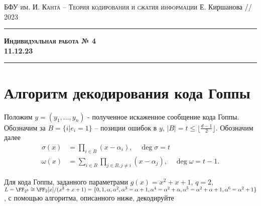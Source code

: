 \documentclass[11pt]{exam}
\theoremstyle{definition}
\newcommand*\abs[1]{\left\lvert#1\right\rvert}
\begin{document}
	{\noindent
		\textsc{БФУ им. И. Канта -- Теория кодирования и сжатия информации}
		\hfill {Е. Киршанова // 2023\\}
	\hrule
	\begin{center}
		{\Large\textbf{
				\textsc{Индивидуальная работа № 4} \\[5pt] {11.12.23}
		} } 
	\end{center}
	\hrule \vspace{5mm}
	
	\thispagestyle{empty}
	
	\vspace{0.2cm}
	
		
	
\section{Алгоритм декодирования кода Гоппы}
		Положим $y = (y_1, \ldots, y_n)$ - полученное искаженное сообщение кода Гоппы. Обозначим за $B = \{ i \vert e_i = 1\}$ -- позиции ошибок в $y$, $\abs{B} = t \leq \lfloor \frac{d-1}{2} \rfloor$. Обозначим далее
		\begin{align*}
				\sigma(x) &= \prod_{i \in B} (x - \alpha_i), \quad \deg \sigma = t \\
				\omega(x) & = \sum_{i \in B} \prod_{j \in B, j \neq i} (x - \alpha_j), \quad \deg \omega = t-1.
		\end{align*}
 	
 		Для кода Гоппы, заданного параметрами  $g(x) = x^2+x+1$, $q=2$, $L = \FF_{2^3} \cong \FF_2[x]/(x^3+x+1)  = \{ 0, 1, \alpha, \alpha^2, \alpha^3 = \alpha+1, \alpha^4 = \alpha^2 + \alpha, \alpha^5 = \alpha^2 + \alpha+1, \alpha^6 = \alpha^2+1 \}$, с помощью алгоритма, описанного ниже, декодируйте \\
 		
 		
 		\def\arraystretch{1.5}
 		\setlength{\tabcolsep}{15pt}
		\begin{center}
		

\end{center}}
\end{document}
